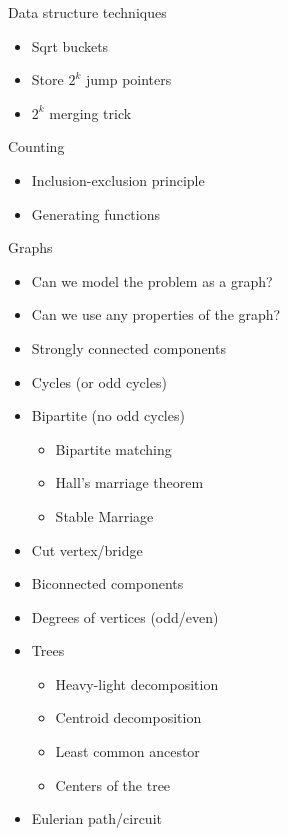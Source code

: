 \begin{myitemize}
\begin{itemize}
        \end{itemize}
      \item Data structure techniques
        \begin{itemize}
          \item Sqrt buckets
          \item Store $2^k$ jump pointers
          \item $2^k$ merging trick
        \end{itemize}
      \item Counting
        \begin{itemize}
          \item Inclusion-exclusion principle
          \item Generating functions
        \end{itemize}
      \item Graphs
        \begin{itemize}
          \item Can we model the problem as a graph?
          \item Can we use any properties of the graph?
          \item Strongly connected components
          \item Cycles (or odd cycles)
          \item Bipartite (no odd cycles)
            \begin{itemize}
              \item Bipartite matching
              \item Hall's marriage theorem
              \item Stable Marriage
            \end{itemize}
          \item Cut vertex/bridge
          \item Biconnected components
          \item Degrees of vertices (odd/even)
          \item Trees
            \begin{itemize}
              \item Heavy-light decomposition
              \item Centroid decomposition
              \item Least common ancestor
              \item Centers of the tree
            \end{itemize}
          \item Eulerian path/circuit

\end{itemize}
\end{myitemize}
